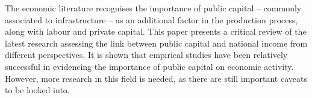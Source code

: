 The economic literature recognises the importance of public capital – commonly associated to infrastructure – as an additional factor in the production process, along with labour and private capital. This paper presents a critical review of the latest research assessing the link between public capital and national income from different perspectives. It is shown that empirical studies have been relatively successful in evidencing the importance of public capital on economic activity. However, more research in this field is needed, as there are still important caveats to be looked into.

